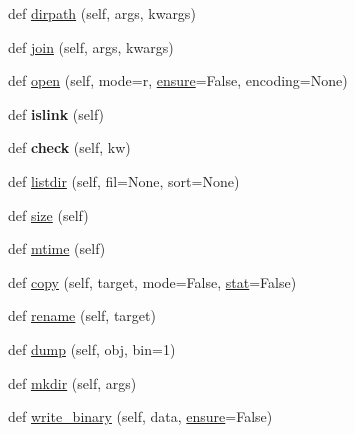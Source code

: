 \begin{DoxyCompactItemize}
\item 
def \hyperlink{classpy_1_1__path_1_1local_1_1_local_path_a7c88510712862f000c40878716e5db82}{dirpath} (self, args, kwargs)
\item 
def \hyperlink{classpy_1_1__path_1_1local_1_1_local_path_ae4a7d13c55fd2f52e77f8856dd508b2d}{join} (self, args, kwargs)
\item 
def \hyperlink{classpy_1_1__path_1_1local_1_1_local_path_ab228910748c4f7299bf2a47e4bdaeb08}{open} (self, mode=\textquotesingle{}r\textquotesingle{}, \hyperlink{classpy_1_1__path_1_1local_1_1_local_path_a31bafde86b043a1a5804f9ed21996251}{ensure}=False, encoding=None)
\item 
\mbox{\label{classpy_1_1__path_1_1local_1_1_local_path_a9e18040ef39943b321e4ee481c15377f}} 
def {\bfseries islink} (self)
\item 
\mbox{\label{classpy_1_1__path_1_1local_1_1_local_path_acbbdfee142aee15760f08702bf4d1c43}} 
def {\bfseries check} (self, kw)
\item 
def \hyperlink{classpy_1_1__path_1_1local_1_1_local_path_ae0d050dd09cd9347b4da4a60a49520ad}{listdir} (self, fil=None, sort=None)
\item 
def \hyperlink{classpy_1_1__path_1_1local_1_1_local_path_a620c3120f5d2ede7f1c227e802504f66}{size} (self)
\item 
def \hyperlink{classpy_1_1__path_1_1local_1_1_local_path_a2cdcbc07a482fec0c653cd6c935c1ef4}{mtime} (self)
\item 
def \hyperlink{classpy_1_1__path_1_1local_1_1_local_path_aa81dad6bcbc3a9c0271a85ccd5ba4ac2}{copy} (self, target, mode=False, \hyperlink{structstat}{stat}=False)
\item 
def \hyperlink{classpy_1_1__path_1_1local_1_1_local_path_aa8d0874d1ae4f9a13c5b8a2843cf4032}{rename} (self, target)
\item 
def \hyperlink{classpy_1_1__path_1_1local_1_1_local_path_aa1515cfdf2ced35d5c3cabfef67d6f1d}{dump} (self, obj, bin=1)
\item 
def \hyperlink{classpy_1_1__path_1_1local_1_1_local_path_a999167bfced1b2b3ffa8701313b8c1bb}{mkdir} (self, args)
\item 
def \hyperlink{classpy_1_1__path_1_1local_1_1_local_path_ad7fa1cb7006e4059c1f75369e902b7fb}{write\+\_\+binary} (self, data, \hyperlink{classpy_1_1__path_1_1local_1_1_local_path_a31bafde86b043a1a5804f9ed21996251}{ensure}=False)

\end{DoxyCompactItemize}
